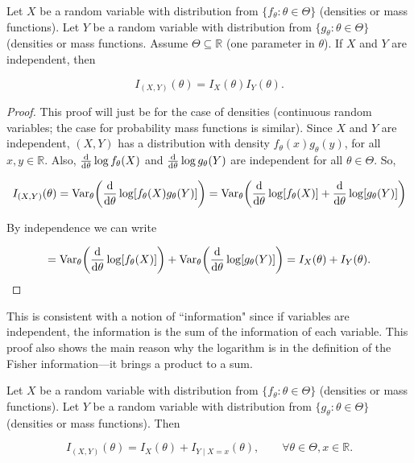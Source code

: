 \begin{proposition}\label{mathstats.541.prop.6.21} Let \(X\) be a random variable with distribution from \(\{f_\theta: \theta \in \Theta\}\) (densities or mass functions). Let \(Y\) be a random variable with distribution from \(\{g_\theta: \theta \in \Theta\}\) (densities or mass functions. Assume \(\Theta \subseteq \mathbb{R}\) (one parameter in \(\theta\)). If \(X\) and \(Y\) are independent, then

\[
I_{(X,Y)}(\theta) = I_X(\theta) I_Y(\theta).
\]

\end{proposition}



\begin{proof} This proof will just be for the case of densities (continuous random variables; the case for probability mass functions is similar). Since \(X\) and \(Y\) are independent, \((X,Y)\) has a distribution with density \(f_\theta(x) g_\theta(y)\), for all \(x, y \in \mathbb{R}\). Also, \(\deriv{}{\theta} \log f_\theta(X)\) and \(\deriv{}{\theta} \log g_\theta(Y)\) are independent for all \(\theta \in \Theta\). So,

\[
I_{(X,Y)}(\theta) = \Var_\theta \bigg( \deriv{}{\theta} \log [f_\theta(X) g_\theta(Y)] \bigg)  = \Var_\theta \bigg( \deriv{}{\theta} \log [f_\theta(X) ] +  \deriv{}{\theta}  \log[ g_\theta(Y)] \bigg)  
\]

By independence we can write

\[
 = \Var_\theta \bigg( \deriv{}{\theta} \log [f_\theta(X) ] \bigg) +  \Var_\theta \bigg( \deriv{}{\theta}  \log[ g_\theta(Y)] \bigg)  = I_X(\theta) + I_Y(\theta).
 \]

\end{proof}

\begin{remark}This is consistent with a notion of ``information" since if variables are independent, the information is the sum of the information of each variable. This proof also shows the main reason why the logarithm is in the definition of the Fisher information---it brings a product to a sum.

\end{remark}

\begin{proposition}Let \(X\) be a random variable with distribution from \(\{f_\theta:\theta \in \Theta\}\) (densities or mass functions). Let \(Y\) be a random variable with distribution from \(\{g_\theta:\theta \in \Theta\}\) (densities or mass functions). Then

\[
I_{(X,Y)}(\theta) = I_X(\theta) + I_{Y\mid X =x}(\theta), \qquad \forall \theta \in \Theta, x \in \mathbb{R}.
\]

\end{proposition}

